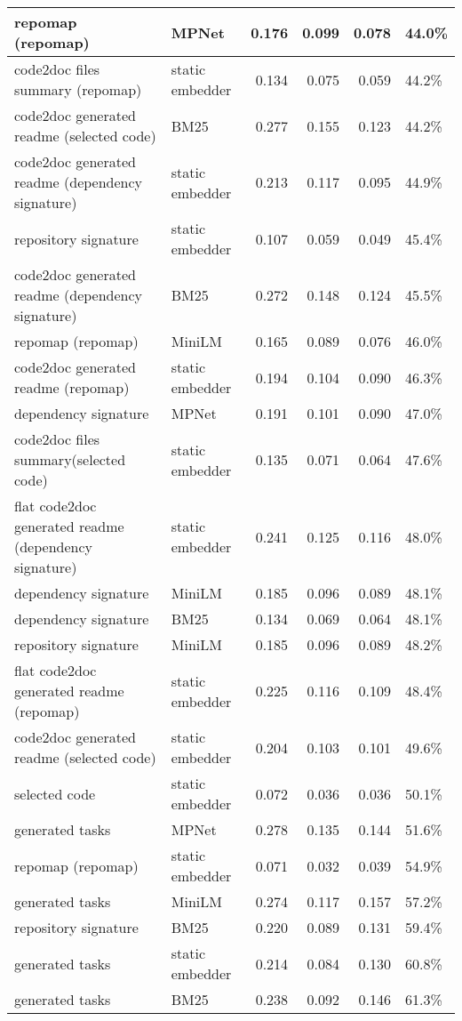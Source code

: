 \begin{tabular}{||l|l|r|r|r|l||}
\hline
{\color{cyan} repomap (repomap)} & MPNet & 0.176 & 0.099 & 0.078 & 44.0\% \\
\hline
{\color{cyan} code2doc files summary (repomap)} & static embedder & 0.134 & 0.075 & 0.059 & 44.2\% \\
\hline
{\color{green} code2doc generated readme (selected code)} & BM25 & 0.277 & 0.155 & 0.123 & 44.2\% \\
\hline
{\color{blue} code2doc generated readme (dependency signature)} & static embedder & 0.213 & 0.117 & 0.095 & 44.9\% \\
\hline
{\color{red} repository signature} & static embedder & 0.107 & 0.059 & 0.049 & 45.4\% \\
\hline
{\color{blue} code2doc generated readme (dependency signature)} & BM25 & 0.272 & 0.148 & 0.124 & 45.5\% \\
\hline
{\color{cyan} repomap (repomap)} & MiniLM & 0.165 & 0.089 & 0.076 & 46.0\% \\
\hline
{\color{cyan} code2doc generated readme (repomap)} & static embedder & 0.194 & 0.104 & 0.090 & 46.3\% \\
\hline
{\color{red} dependency signature} & MPNet & 0.191 & 0.101 & 0.090 & 47.0\% \\
\hline
{\color{green} code2doc files summary(selected code)} & static embedder & 0.135 & 0.071 & 0.064 & 47.6\% \\
\hline
{\color{blue} flat code2doc generated readme (dependency signature)} & static embedder & 0.241 & 0.125 & 0.116 & 48.0\% \\
\hline
{\color{red} dependency signature} & MiniLM & 0.185 & 0.096 & 0.089 & 48.1\% \\
\hline
{\color{red} dependency signature} & BM25 & 0.134 & 0.069 & 0.064 & 48.1\% \\
\hline
{\color{red} repository signature} & MiniLM & 0.185 & 0.096 & 0.089 & 48.2\% \\
\hline
{\color{cyan} flat code2doc generated readme (repomap)} & static embedder & 0.225 & 0.116 & 0.109 & 48.4\% \\
\hline
{\color{green} code2doc generated readme (selected code)} & static embedder & 0.204 & 0.103 & 0.101 & 49.6\% \\
\hline
selected code & static embedder & 0.072 & 0.036 & 0.036 & 50.1\% \\
\hline
generated tasks & MPNet & 0.278 & 0.135 & 0.144 & 51.6\% \\
\hline
{\color{cyan} repomap (repomap)} & static embedder & 0.071 & 0.032 & 0.039 & 54.9\% \\
\hline
generated tasks & MiniLM & 0.274 & 0.117 & 0.157 & 57.2\% \\
\hline
{\color{red} repository signature} & BM25 & 0.220 & 0.089 & 0.131 & 59.4\% \\
\hline
generated tasks & static embedder & 0.214 & 0.084 & 0.130 & 60.8\% \\
\hline
generated tasks & BM25 & 0.238 & 0.092 & 0.146 & 61.3\% \\
\hline
\hline
\bottomrule
\end{tabular}
